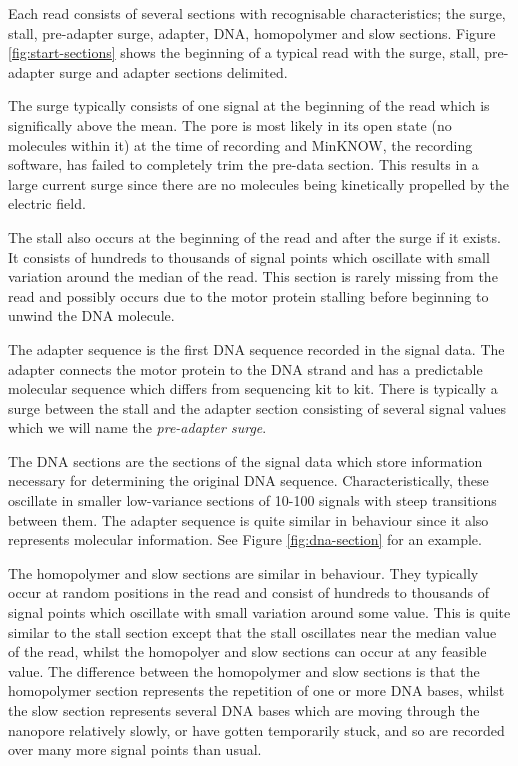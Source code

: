 Each read consists of several sections with recognisable characteristics; the surge, stall, pre-adapter surge, adapter, DNA, homopolymer and slow sections. Figure \ref{fig:start-sections} shows the beginning of a typical read with the surge, stall, pre-adapter surge and adapter sections delimited.

The surge typically consists of one signal at the beginning of the read which is significally above the mean. The pore is most likely in its open state (no molecules within it) at the time of recording and MinKNOW, the recording software, has failed to completely trim the pre-data section. This results in a large current surge since there are no molecules being kinetically propelled by the electric field.

The stall also occurs at the beginning of the read and after the surge if it exists. It consists of hundreds to thousands of signal points which oscillate with small variation around the median of the read. This section is rarely missing from the read and possibly occurs due to the motor protein stalling before beginning to unwind the DNA molecule.

The adapter sequence is the first DNA sequence recorded in the signal data. The adapter connects the motor protein to the DNA strand and has a predictable molecular sequence which differs from sequencing kit to kit. There is typically a surge between the stall and the adapter section consisting of several signal values which we will name the \textit{pre-adapter surge}.



The DNA sections are the sections of the signal data which store information necessary for determining the original DNA sequence. Characteristically, these oscillate in smaller low-variance sections of 10-100 signals with steep transitions between them. The adapter sequence is quite similar in behaviour since it also represents molecular information. See Figure \ref{fig:dna-section} for an example.



The homopolymer and slow sections are similar in behaviour. They typically occur at random positions in the read and consist of hundreds to thousands of signal points which oscillate with small variation around some value. This is quite similar to the stall section except that the stall oscillates near the median value of the read, whilst the homopolyer and slow sections can occur at any feasible value. The difference between the homopolymer and slow sections is that the homopolymer section represents the repetition of one or more DNA bases, whilst the slow section represents several DNA bases which are moving through the nanopore relatively slowly, or have gotten temporarily stuck, and so are recorded over many more signal points than usual.

